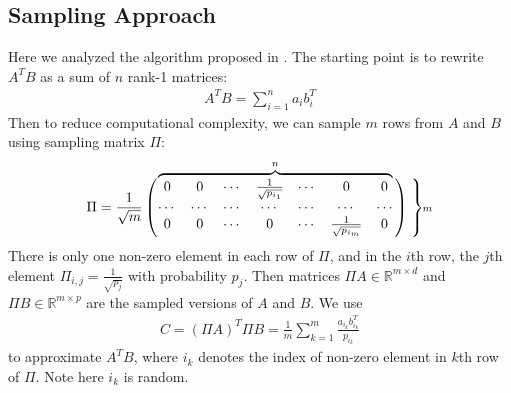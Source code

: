 \documentclass[11pt]{article}
\begin{document}
\subsection{Sampling Approach}
Here we analyzed the algorithm proposed in \cite{Drineas06}. The starting point is to rewrite $A^TB$ as a sum of $n$ rank-1 matrices:
\begin{align*}
A^TB = \sum_{i=1}^na_i b_i^T
\end{align*}
Then to reduce computational complexity, we can sample $m$ rows from $A$ and $B$ using sampling matrix $\Pi$:
\def\matriximg{%
  \begin{matrix}
    0 & 0 & \cdots & \frac{1}{\sqrt{p_{i_1}}} & \cdots & 0 & 0  \\
    \cdots & \cdots & \cdots &\cdots & \cdots & \cdots & \cdots \\
    0 & 0 & \cdots & 0 & \cdots & \frac{1}{\sqrt{p_{i_m}}} & 0
   \end{matrix}
}%
\begin{align*}
\Pi = \frac{1}{\sqrt{m}}\left(\vphantom{\matriximg}\right.\kern-2\nulldelimiterspace
  \overbrace{\matriximg}^{\text{\scriptsize $n$}}\kern-\nulldelimiterspace\left.\vphantom{\matriximg}\right)
  \left.\vphantom{\matriximg}\right\}\kern-2\nulldelimiterspace\text{\scriptsize $m$}
\end{align*}
There is only one non-zero element in each row of $\Pi$, and in the $i$th row, the $j$th element $\Pi_{i,j}=\frac{1}{\sqrt{p_j}}$ with probability $p_j$. Then matrices $\Pi A\in \mathbb{R}^{m\times d}$ and $\Pi B\in \mathbb{R}^{m\times p}$ are the sampled versions of $A$ and $B$. We use
\begin{align*}
C = (\Pi A)^T\Pi B = \frac{1}{{m}}\sum_{k=1}^m \frac{a_{i_k}b_{i_k}^T}{p_{i_k}}
\end{align*}
to approximate $A^T B$, where $i_k$ denotes the index of non-zero element in $k$th row of $\Pi$. Note here $i_k$ is random.
\end{document}
